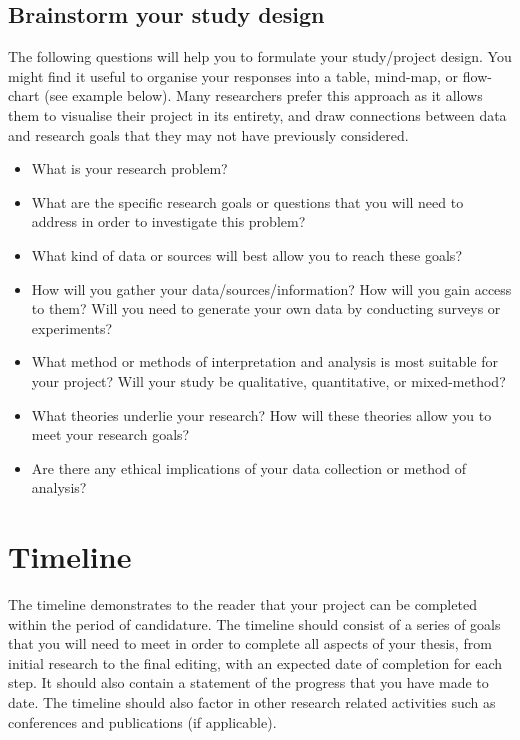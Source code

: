 \documentclass[12pt, a4paper]{article}
\begin{document}
\subsection{Brainstorm your study design}

The following questions will help you to formulate your study/project design. You might find it useful to organise your responses into a table, mind-map, or flow-chart (see example below). Many researchers prefer this approach as it allows them to visualise their project in its entirety, and draw connections between data and research goals that they may not have previously considered.
\begin{itemize}
\item What is your research problem?
\item What are the specific research goals or questions that you will need to address in order to investigate this problem?
\item What kind of data or sources will best allow you to reach these goals?
\item How will you gather your data/sources/information? How will you gain access to them? Will you need to generate your own data by conducting surveys or experiments?
\item What method or methods of interpretation and analysis is most suitable for your project? Will your study be qualitative, quantitative, or mixed-method?
\item What theories underlie your research? How will these theories allow you to meet your research goals?
\item Are there any ethical implications of your data collection or method of analysis?
\end{itemize}


\section{Timeline}
The timeline demonstrates to the reader that your project can be completed within the period of candidature. The timeline should consist of a series of goals that you will need to meet in order to complete all aspects of your thesis, from initial research to the final editing, with an expected date of completion for each step. It should also contain a statement of the progress that you have made to date. The timeline should also factor in other research related activities such as conferences and publications (if applicable).
\end{document}
